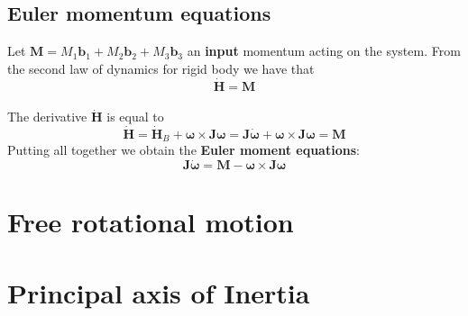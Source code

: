 \subsection{Euler momentum equations}
Let $\mathbf{M}=M_1\mathbf{b}_1+M_2\mathbf{b}_2+M_3\mathbf{b}_3$ an \textbf{input} momentum acting on the system. From the second law of dynamics for rigid body we have that
{\large{
    \begin{equation}
        \dot{\mathbf{H}}=\mathbf{M}
    \end{equation}
}}\\
The derivative $\dot{\mathbf{H}}$ is equal to
\begin{equation*}
    \dot{\mathbf{H}} = \dot{\mathbf{H}}_B + \boldsymbol{\omega} \times \mathbf{J}\boldsymbol{\omega} = 
    \mathbf{J}\dot{\boldsymbol{\omega}} + \mathbf{\omega} \times \mathbf{J}\boldsymbol{\omega}=\mathbf{M}
\end{equation*}
Putting all together we obtain the \textbf{Euler moment equations}:
{\Large{
    \begin{equation}
        \mathbf{J}\dot{\boldsymbol{\omega}} = 
        \mathbf{M} - \boldsymbol{\omega}\times\boldsymbol{J\omega}
    \end{equation}
}}

\section{Free rotational motion}

\section{Principal axis of Inertia}




